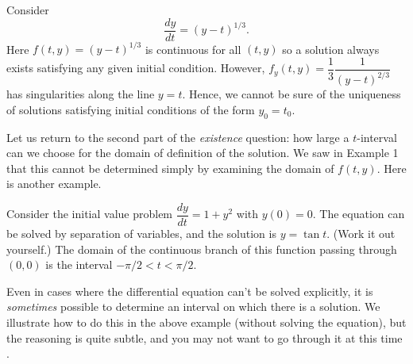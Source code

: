 \nextex
{}  Consider
$$
\frac{dy}{dt} = (y - t)^{1/3}.
$$
Here $f(t,y) = (y - t)^{1/3}$ is continuous for all $(t,y)$ so
a solution always exists satisfying any given initial condition.
However, $f_y(t,y) = \dfrac 13\dfrac 1{(y - t)^{2/3}}$ has
singularities along the line $y = t$.  Hence, we cannot be
sure of the uniqueness of solutions satisfying initial
conditions of the form $y_0 = t_0$.
\endexample

Let us return to the second part of the {\it existence\/} question:
how large a $t$-interval can we choose for the domain of definition
of the solution.  We saw in Example 1
that this cannot be determined simply by examining the
domain of $f(t,y)$.  Here is another example.  


\nextex
{}
Consider the initial value problem $\dfrac{dy}{dt} = 1 + y^2$
with $y(0) = 0$.   The equation can be solved by separation of
variables, and the solution is  $y = \tan t$.  (Work it out
yourself.)  The domain of the continuous branch of this function
passing through $(0,0)$ is  the interval $-\pi/2 < t < \pi/2$.
\endexample

Even in cases where the differential equation can't be
solved explicitly, it is {\it sometimes\/} possible to
determine an interval on which there is a solution.
We illustrate how to do this in the above example
(without solving the equation), but 
the reasoning 
is quite subtle, and you may not want to go through it at
this time .


